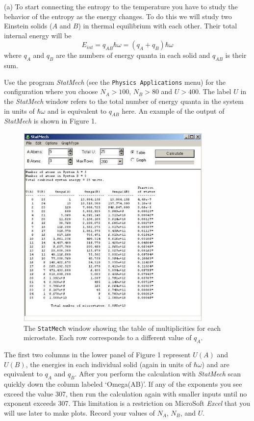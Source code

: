 (a) To start connecting the entropy to the temperature you have to study the 
behavior of the entropy as the energy changes.
To do this we will study two Einstein solids ($A$ and $B$) in thermal equilibrium with 
each other.
Their total internal energy will be
\begin{equation}
E_{int} = q_{AB}\hbar \omega = (q_A + q_B) \hbar \omega
\end{equation}
where $q_A$ and $q_B$ are the numbers of energy quanta in each solid and $q_{AB}$ is 
their sum.

Use the program {\it StatMech} (see the {\tt Physics Applications} menu)
for the configuration where you choose $N_A > 100$, $N_B > 80$ and $U>400$.
The label $U$ in the {\it StatMech} window refers to the total number of energy quanta 
in the system
in units of $\hbar \omega$ and is equivalent to $q_{AB}$ here.
An example of the output of {\it StatMech} is shown in Figure 1.
\begin{figure}[ht!]
\begin{center}
\includegraphics[height=4.0in]{S+T/statmech1.eps}
\caption{The {\tt StatMech} window showing the table of multiplicities for each microstate.
Each row corresponds to a different value of $q_A$.}
\end{center}
\end{figure}
The first two columns in the lower panel of Figure 1 represent $U(A)$ and $U(B)$, 
the energies in each 
individual solid (again in units of $\hbar \omega$) and are equivalent to $q_A$ and $q_B$.
After you perform the calculation with {\it StatMech} scan quickly down the column
labeled `Omega(AB)'.
If any of the exponents you see exceed the value 307, then run the calculation again with 
smaller inputs until no exponent exceeds 307.
This limitation is a restriction on MicroSoft {\it Excel} that you will use later to make
plots.
Record your values of $N_A$, $N_B$, and $U$.
\vspace{15mm}

